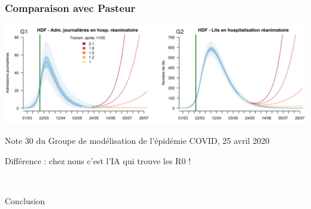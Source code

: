 \documentclass[a4paper]{cours-bdd}
\begin{document}

\begin{frame}[fragile]
  \frametitle{Comparaison avec Pasteur}

  \begin{center}
    \includegraphics[width=\linewidth]{Inserm+Pasteur_HdF.png}

    {\scriptsize Note 30 du Groupe de modélisation de l’épidémie COVID, 25 avril 2020}

    \bigskip
    
    \begin{block}{}
      \begin{center}
        Différence : chez nous c'est l'IA qui trouve les R0 !
      \end{center}
    \end{block}
  \end{center}

\end{frame}





\begin{frame}
  \hfill \
  \begin{center}
    \Huge
    Conclusion
  \end{center}
  \hfill \

\end{frame}



\end{document}
